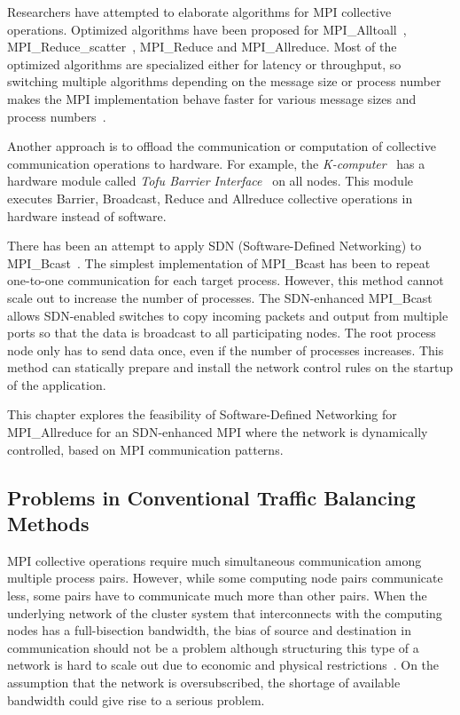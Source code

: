 Researchers have attempted to elaborate algorithms for MPI collective
operations. Optimized algorithms have been proposed for
MPI\_Alltoall~\autocite{Bruck1997}, MPI\_Reduce\_scatter~\autocite{Iannello1997},
MPI\_Reduce and MPI\_Allreduce. Most of the optimized
algorithms are specialized either for latency or throughput, so switching
multiple algorithms depending on the message size or process number makes the
MPI implementation behave faster for various message sizes and process
numbers~\autocite{Thakur2005}.

Another approach is to offload the communication or computation of
collective communication operations to hardware. For example, the
\emph{K-computer}~\autocite{Yokokawa2011} has a hardware module called \emph{Tofu
Barrier Interface}~\autocite{Ajima2012} on all nodes. This module executes
Barrier, Broadcast, Reduce and Allreduce collective operations in hardware
instead of software.

There has been an attempt to apply SDN (Software-Defined Networking) to
MPI\_Bcast~\autocite{Dashdavaa2013}. The simplest implementation of MPI\_Bcast has
been to repeat one-to-one communication for each target process. However, this
method cannot scale out to increase the number of processes. The SDN-enhanced
MPI\_Bcast allows SDN-enabled switches to copy incoming packets and output
from multiple ports so that the data is broadcast to all participating nodes.
The root process node only has to send data once, even if the number of
processes increases. This method can statically prepare and install the
network control rules on the startup of the application.

This chapter explores the feasibility of Software-Defined Networking for
MPI\_Allreduce for an SDN-enhanced MPI where the network is dynamically
controlled, based on MPI communication patterns.

\subsection{Problems in Conventional Traffic Balancing Methods}

MPI collective operations require much simultaneous communication among
multiple process pairs. However, while some computing node pairs
communicate less, some pairs have to communicate much more than other
pairs. When the underlying network of the cluster system that
interconnects with the computing nodes has a full-bisection bandwidth,
the bias of source and destination in communication should not be a
problem although structuring this type of a network is hard to scale out
due to economic and physical restrictions~\autocite{Al-Fares2008}. On the
assumption that the network is oversubscribed, the shortage of available
bandwidth could give rise to a serious problem.

